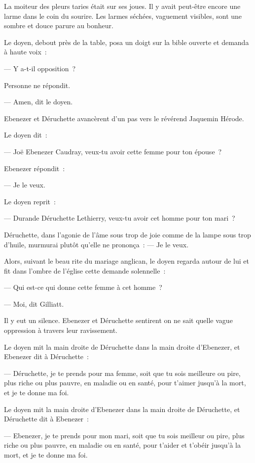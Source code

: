 \documentclass[french,twoside]{book} %
\begin{document}
La moiteur des pleurs taries était sur ses joues. Il y avait peut-être encore une larme dans le coin du sourire. Les larmes séchées, vaguement visibles, sont une sombre et douce parure au bonheur.\par
 Le doyen, debout près de la table, posa un doigt sur la bible ouverte et demanda à haute voix :\par
— Y a-t-il opposition ?\par
Personne ne répondit.\par
— Amen, dit le doyen.\par
Ebenezer et Déruchette avancèrent d’un pas vers le révérend Jaquemin Hérode.\par
Le doyen dit :\par
— Joë Ebenezer Caudray, veux-tu avoir cette femme pour ton épouse ?\par
Ebenezer répondit :\par
— Je le veux.\par
Le doyen reprit :\par
— Durande Déruchette Lethierry, veux-tu avoir cet homme pour ton mari ?\par
Déruchette, dans l’agonie de l’âme sous trop de joie comme de la lampe sous trop d’huile, murmurai plutôt qu’elle ne prononça : — Je le veux.\par
Alors, suivant le beau rite du mariage anglican, le doyen regarda autour de lui et fit dans l’ombre de l’église cette demande solennelle :\par
— Qui est-ce qui donne cette femme à cet homme ?\par
— Moi, dit Gilliatt.\par
Il y eut un silence. Ebenezer et Déruchette sentirent on ne sait quelle vague oppression à travers leur ravissement.\par
Le doyen mit la main droite de Déruchette dans la main droite d’Ebenezer, et Ebenezer dit à Déruchette :\par
— Déruchette, je te prends pour ma femme, soit  que tu sois meilleure ou pire, plus riche ou plus pauvre, en maladie ou en santé, pour t’aimer jusqu’à la mort, et je te donne ma foi.\par
Le doyen mit la main droite d’Ebenezer dans la main droite de Déruchette, et Déruchette dit à Ebenezer :\par
— Ebenezer, je te prends pour mon mari, soit que tu sois meilleur ou pire, plus riche ou plus pauvre, en maladie ou en santé, pour t’aider et t’obéir jusqu’à la mort, et je te donne ma foi.\par
\end{document}
